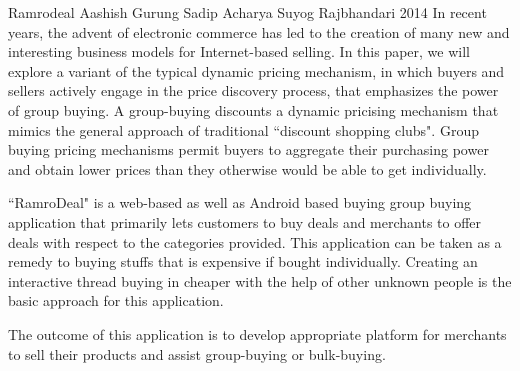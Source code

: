 \begin{conf-abstract}[]
{Ramrodeal}
{
Aashish Gurung
Sadip Acharya
Suyog Rajbhandari
}
{2014}
In recent years, the advent of electronic commerce has led to the creation of 
many new and interesting business models for Internet-based selling. In this
paper, we will explore a variant of the typical dynamic pricing mechanism, in
which buyers and sellers actively engage in the price discovery process, that
emphasizes the power of group buying. A group-buying discounts a dynamic
pricising mechanism that mimics the general approach of traditional ``discount
shopping clubs". Group buying pricing mechanisms permit buyers to aggregate
their purchasing power and obtain lower prices than they otherwise would be
able to get individually.

``RamroDeal" is a web-based as well as Android based buying group buying 
application that primarily lets customers to buy deals and merchants to offer
deals with respect to the categories provided. This application can be taken as a
remedy to buying stuffs that is expensive if bought individually. Creating an
interactive thread buying in cheaper with the help of other unknown people is
the basic approach for this application.

The outcome of this application is to develop appropriate
platform for merchants to sell their products and assist group-buying or bulk-buying.
  \end{conf-abstract}